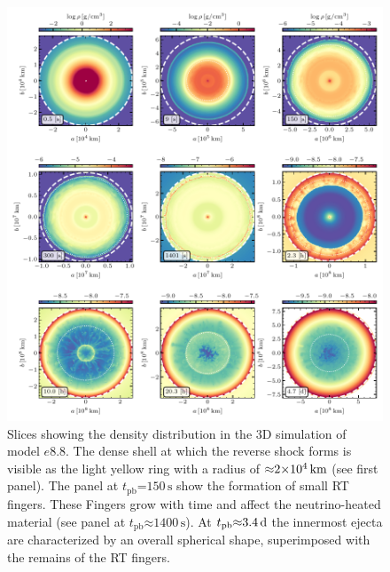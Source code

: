 \documentclass[fleqn,usenatbib]{mnras}
\newcommand{\tpb}{\ensuremath{t_{\text{pb}}}}
\newcommand{\s}{\ensuremath{\text{s}}}
\begin{document}
\begin{figure}%
\includegraphics[width=\textwidth]{pic/e8_3d_3x3_den.pdf}
    \caption{Slices showing the density distribution
    in the 3D simulation of model $e8.8$. The dense shell at which the reverse shock 
    forms is visible as the light yellow ring with a radius of $\mathord{\approx} 2\mathord{\times}10^4\,\rm km$
    (see first panel).
    The panel at $\tpb\mathord{=}150\,\s$ show the formation of small RT fingers.
    These Fingers grow with time and affect the neutrino-heated material (see panel at
    $\tpb\mathord{\approx}1400 \, \s$).
    At $\tpb\mathord{\approx}3.4\,\rm d$ the innermost ejecta are characterized by an overall
    spherical shape, superimposed with the remains of the RT fingers.}
\label{fig:e8 rho cuts}
\end{figure}%
\end{document}
